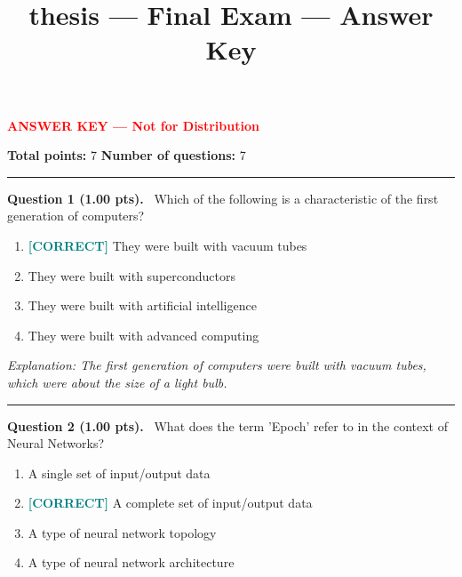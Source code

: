 \documentclass[12pt,a4paper]{article}
\title{thesis — Final Exam --- Answer Key}
\date{}
\begin{document}
\maketitle

{\large \textbf{\textcolor{red}{ANSWER KEY --- Not for Distribution}}}

\vspace{0.5em}



\noindent
\textbf{Total points:} 7
\hfill
\textbf{Number of questions:} 7

\vspace{1em}
\hrule
\vspace{1.5em}


\noindent
\textbf{Question 1 (1.00 pts).}~
Which of the following is a characteristic of the first generation of computers?


\begin{enumerate}[label=\textbf{\Alph*.}]

  \item \textbf{\textcolor{teal}{[CORRECT]}}  They were built with vacuum tubes

  \item They were built with superconductors

  \item They were built with artificial intelligence

  \item They were built with advanced computing

\end{enumerate}



\textit{\small Explanation: The first generation of computers were built with vacuum tubes, which were about the size of a light bulb.}



\vspace{0.8em}
\noindent\rule{\linewidth}{0.2pt}
\vspace{0.3em}


\noindent
\textbf{Question 2 (1.00 pts).}~
What does the term 'Epoch' refer to in the context of Neural Networks?


\begin{enumerate}[label=\textbf{\Alph*.}]

  \item A single set of input/output data

  \item \textbf{\textcolor{teal}{[CORRECT]}}  A complete set of input/output data

  \item A type of neural network topology

  \item A type of neural network architecture

\end{enumerate}
\end{document}
